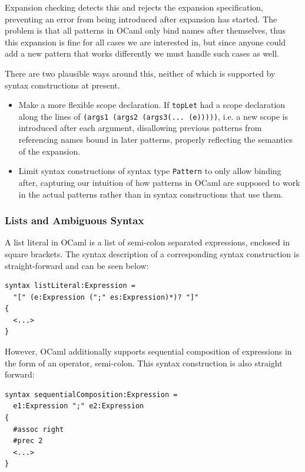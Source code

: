 \documentclass{kththesis}
\begin{document}
Expansion checking detects this and rejects the expansion specification, preventing an error from being introduced after expansion has started. The problem is that all patterns in OCaml only bind names after themselves, thus this expansion is fine for all cases we are interested in, but since anyone could add a new pattern that works differently we must handle such cases as well.

There are two plausible ways around this, neither of which is supported by syntax constructions at present.
\begin{itemize}
  \item Make a more flexible scope declaration. If \texttt{topLet} had a scope declaration along the lines of \texttt{(args1 (args2 (args3(... (e)))))}, i.e. a new scope is introduced after each argument, disallowing previous patterns from referencing names bound in later patterns, properly reflecting the semantics of the expansion.

  \item Limit syntax constructions of syntax type \texttt{Pattern} to only allow binding after, capturing our intuition of how patterns in OCaml are supposed to work in the actual patterns rather than in syntax constructions that use them.
\end{itemize}

\subsubsection{Lists and Ambiguous Syntax} \label{sec:ambiguous-lists}

A list literal in OCaml is a list of semi-colon separated expressions, enclosed in square brackets. The syntax description of a corresponding syntax construction is straight-forward and can be seen below:

\begin{verbatim}
syntax listLiteral:Expression =
  "[" (e:Expression (";" es:Expression)*)? "]"
{
  <...>
}
\end{verbatim}

However, OCaml additionally supports sequential composition of expressions in the form of an operator, semi-colon. This syntax construction is also straight forward:

\begin{verbatim}
syntax sequentialComposition:Expression =
  e1:Expression ";" e2:Expression
{
  #assoc right
  #prec 2
  <...>
}
\end{verbatim}
\end{document}
